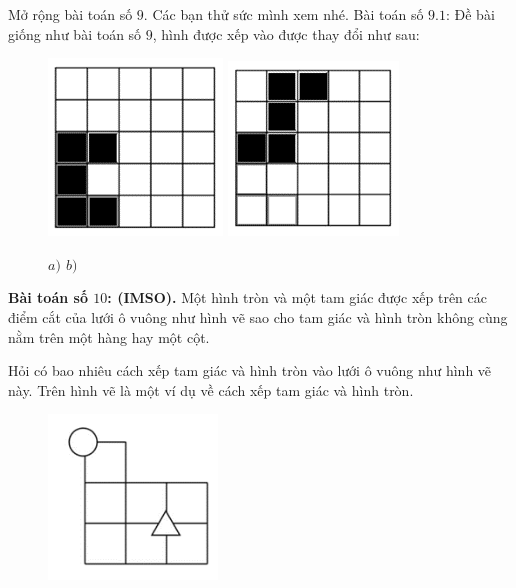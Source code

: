 \begin{multicols}{2}
\begin{multicols}{2}
	\end{multicols}
	Mở rộng bài toán số $9$. Các bạn thử sức mình xem nhé.
	\vskip 0.1cm
	Bài toán số $9.1$: Đề bài giống như bài toán số $9$, hình được xếp vào được thay đổi như sau:
	\begin{figure}[H]
		\centering
		\vspace*{-5pt}
		\captionsetup{labelformat=empty, justification=centering}
		\includegraphics[height=0.4\textwidth]{_16}\quad
		\includegraphics[height=0.4\textwidth]{_17}
		\caption{\small\textit{$a)$ \hspace*{130pt} $b)$}}
		\vspace*{-15pt}
	\end{figure}
	\textbf{Bài toán số $10$: (IMSO).}
	\vskip 0.1cm
	Một hình tròn và một tam giác được xếp trên các điểm cắt của lưới ô vuông như hình vẽ sao cho tam giác và hình tròn không cùng nằm trên một hàng hay một cột.
	\vskip 0.1cm
	\begin{multicols}{2}
		Hỏi có bao nhiêu cách xếp tam giác và hình tròn vào lưới ô vuông như hình vẽ này. Trên hình vẽ là một ví dụ về cách xếp tam giác và hình tròn.
		\begin{figure}[H]
			\centering
			\vspace*{-25pt}
			\captionsetup{labelformat=empty, justification=centering}
			\includegraphics[width=0.4\textwidth]{_18}

\end{figure}
\end{multicols}
\end{multicols}
